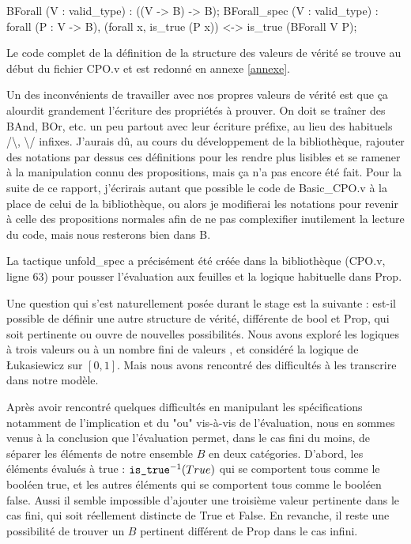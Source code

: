 \documentclass{article}
\newcommand\code[1]{{\fontfamily{lmtt}\selectfont #1}}
\theoremstyle{definition}
\begin{document}
\begin{coq}  
  BForall (V : valid_type) : ((V -> B) -> B);
  BForall_spec (V : valid_type) : forall (P : V -> B), 
    (forall x, is_true (P x)) <-> is_true (BForall V P);
\end{coq}

Le code complet de la définition de la structure des valeurs de vérité se trouve au début du fichier \code{CPO.v} et est redonné en annexe \ref{annexe}.

\medskip

Un des inconvénients de travailler avec nos propres valeurs de vérité est que ça alourdit grandement l'écriture des propriétés à prouver. On doit se traîner des \code{BAnd}, \code{BOr}, etc. un peu partout avec leur écriture préfixe, au lieu des habituels /\textbackslash, \textbackslash / infixes. J'aurais dû, au cours du développement de la bibliothèque, rajouter des notations par dessus ces définitions pour les rendre plus lisibles et se ramener à la manipulation connu des propositions, mais ça n'a pas encore été fait. Pour la suite de ce rapport, j'écrirais autant que possible le code de \code{Basic\_CPO.v} à la place de celui de la bibliothèque, ou alors je modifierai les notations pour revenir à celle des propositions normales afin de ne pas complexifier inutilement la lecture du code, mais nous resterons bien dans B.

La tactique \code{unfold\_spec} a précisément été créée dans la bibliothèque (\code{CPO.v}, ligne 63) pour pousser l'évaluation aux feuilles et la logique habituelle dans \code{Prop}.


\bigskip

Une question qui s'est naturellement posée durant le stage est la suivante : est-il possible de définir une autre structure de vérité, différente de \code{bool} et \code{Prop}, qui soit pertinente ou ouvre de nouvelles possibilités. Nous avons exploré les logiques à trois valeurs ou à un nombre fini de valeurs \cite{manylogic}, et considéré la logique de Łukasiewicz sur $[0,1]$. Mais nous avons rencontré des difficultés à les transcrire dans notre modèle.

Après avoir rencontré quelques difficultés en manipulant les spécifications notamment de l'implication et du "ou" vis-à-vis de l'évaluation, nous en sommes venus à la conclusion que l'évaluation permet, dans le cas fini du moins, de séparer les éléments de notre ensemble $B$ en deux catégories. D'abord, les éléments évalués à true : $\text{\code{is\_true}}^{-1}(True)$ qui se comportent tous comme le booléen \code{true}, et les autres éléments qui se comportent tous comme le booléen \code{false}. Aussi il semble impossible d'ajouter une troisième valeur pertinente dans le cas fini, qui soit réellement distincte de True et False. En revanche, il reste une possibilité de trouver un $B$ pertinent différent de Prop dans le cas infini.
\end{document}
